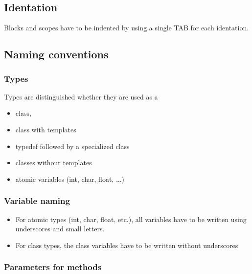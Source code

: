 \documentclass[10pt,a4paper]{article}
\begin{document}
\subsection{Identation}
Blocks and scopes have to be indented by using a single TAB for each identation.

\subsection{Naming conventions}

\subsubsection{Types}

Types are distinguished whether they are used as a
\begin{itemize}
	\item class,
	\item class with templates
	\item typedef followed by a specialized class
	\item classes without templates
	\item atomic variables (int, char, float, ...)
\end{itemize}



\subsubsection{Variable naming}

\begin{itemize}
	\item For atomic types (int, char, float, etc.), all variables have to be written using underscores and small letters.

	\item For class types, the class variables have to be written without underscores
\end{itemize}

\subsubsection{Parameters for methods}
\end{document}
